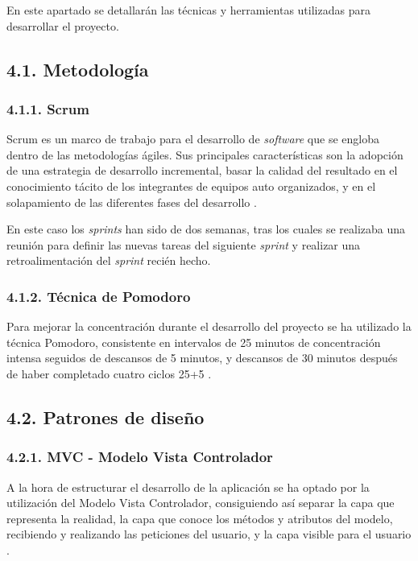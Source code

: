 
En este apartado se detallarán las técnicas y herramientas utilizadas para desarrollar el proyecto.

\subsection{4.1. Metodología}

\subsubsection{4.1.1. Scrum}
Scrum es un marco de trabajo para el desarrollo de \textit{software} que se engloba dentro de las metodologías ágiles. Sus principales características son la adopción de una estrategia de desarrollo incremental, basar la calidad del resultado en el conocimiento tácito de los integrantes de equipos auto organizados, y en el solapamiento de las diferentes fases del desarrollo \cite{wiki:scrum}.

En este caso los \textit{sprints} han sido de dos semanas, tras los cuales se realizaba una reunión para definir las nuevas tareas del siguiente \textit{sprint} y realizar una retroalimentación del \textit{sprint} recién hecho.

\subsubsection{4.1.2. Técnica de Pomodoro}

Para mejorar la concentración durante el desarrollo del proyecto se ha utilizado la técnica Pomodoro, consistente en intervalos de 25 minutos de concentración intensa seguidos de descansos de 5 minutos, y descansos de 30 minutos después de haber completado cuatro ciclos 25+5 \cite{wiki:pomodoro}.

\subsection{4.2. Patrones de diseño}

\subsubsection{4.2.1. MVC - Modelo Vista Controlador}

A la hora de estructurar el desarrollo de la aplicación se ha optado por la utilización del Modelo Vista Controlador, consiguiendo así separar la capa que representa la realidad, la capa que conoce los métodos y atributos del modelo, recibiendo y realizando las peticiones del usuario, y la capa visible para el usuario \cite{web:patronDis}.


